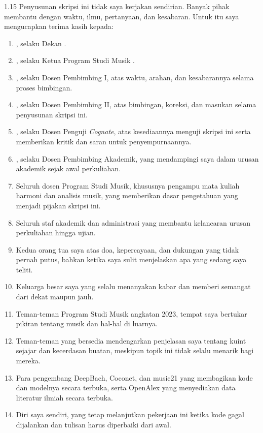 \begin{spacing}{1.15}
Penyusunan skripsi ini tidak saya kerjakan sendirian. Banyak pihak membantu dengan waktu, ilmu, pertanyaan, dan kesabaran. Untuk itu saya mengucapkan terima kasih kepada:
\begin{enumerate}
    \setlength{\itemsep}{0pt}
    \item \deanname, selaku Dekan \facultyname{} \institutionname.
    \item \programcoordinator, selaku Ketua Program Studi Musik \facultyname{} \institutionname.
    \item \advisorone, selaku Dosen Pembimbing I, atas waktu, arahan, dan kesabarannya selama proses bimbingan.
    \item \advisortwo, selaku Dosen Pembimbing II, atas bimbingan, koreksi, dan masukan selama penyusunan skripsi ini.
    \item \cognate, selaku Dosen Penguji \textit{Cognate}, atas kesediaannya menguji skripsi ini serta memberikan kritik dan saran untuk penyempurnaannya.
    \item \advisoracademic, selaku Dosen Pembimbing Akademik, yang mendampingi saya dalam urusan akademik sejak awal perkuliahan.
    \item Seluruh dosen Program Studi Musik, khususnya pengampu mata kuliah harmoni dan analisis musik, yang memberikan dasar pengetahuan yang menjadi pijakan skripsi ini.
    \item Seluruh staf akademik dan administrasi \facultyname{} \institutionname{} yang membantu kelancaran urusan perkuliahan hingga ujian.
    \item Kedua orang tua saya atas doa, kepercayaan, dan dukungan yang tidak pernah putus, bahkan ketika saya sulit menjelaskan apa yang sedang saya teliti.
    \item Keluarga besar saya yang selalu menanyakan kabar dan memberi semangat dari dekat maupun jauh.
    \item Teman-teman Program Studi Musik angkatan 2023, tempat saya bertukar pikiran tentang musik dan hal-hal di luarnya.
    \item Teman-teman yang bersedia mendengarkan penjelasan saya tentang kuint sejajar dan kecerdasan buatan, meskipun topik ini tidak selalu menarik bagi mereka.
    \item Para pengembang DeepBach, Coconet, dan music21 yang membagikan kode dan modelnya secara terbuka, serta OpenAlex yang menyediakan data literatur ilmiah secara terbuka.
    \item Diri saya sendiri, yang tetap melanjutkan pekerjaan ini ketika kode gagal dijalankan dan tulisan harus diperbaiki dari awal.
\end{enumerate}


\end{spacing}
